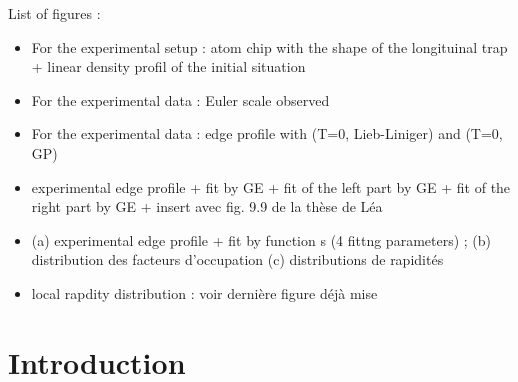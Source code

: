 \documentclass[submission, Phys]{SciPost}
\begin{document}
List of figures  : 
\begin{itemize}
    \item For the experimental setup : atom chip with the shape of the longituinal trap + linear density profil of the initial situation
    \item For the experimental data : Euler scale observed
    \item For the experimental data : edge profile with (T=0, Lieb-Liniger) and (T=0, GP) 
    \item experimental edge profile + fit by GE + fit of the left part by GE + fit of the right part by GE + insert avec fig. 9.9 de la thèse de Léa 
    \item (a) experimental edge profile + fit by  function s (4 fittng parameters) ; (b) distribution des facteurs d'occupation (c) distributions de rapidités
    \item  local rapdity distribution : voir dernière figure déjà mise 
\end{itemize}

\section{Introduction} 
\label{sec:intro}
\end{document}
